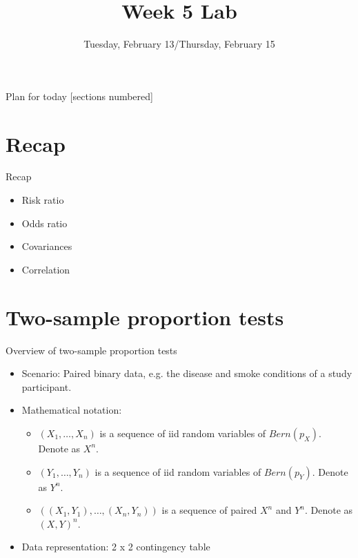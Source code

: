 \documentclass[12pt, t, xcolor=dvipsnames]{beamer}
\title{Week 5 Lab}
\date{Tuesday, February 13/Thursday, February 15}
\begin{document}
\maketitle

\begin{frame}{Plan for today}
[sections numbered]
\begin{minipage}[t][3cm][t]{\textwidth}
  \tableofcontents
\end{minipage}

\end{frame}

\section*{Recap}

\begin{frame}{Recap}
  \begin{itemize}
    \item Risk ratio
    \item Odds ratio
    \item Covariances
    \item Correlation
  \end{itemize}
\end{frame}

\section{Two-sample proportion tests} %
\label{sec:two_sample_proportion_tests}

\begin{frame}{Overview of two-sample proportion tests}

\begin{itemize}
  \item Scenario: Paired binary data, e.g. the disease and smoke conditions of a study participant. 
  \item Mathematical notation:
  \begin{itemize}
    \item  $(X_1, \ldots, X_n)$ is a sequence of iid random variables of $Bern(p_X)$. Denote as $X^n$.
    \item  $(Y_1, \ldots, Y_n)$ is a sequence of iid random variables of $Bern(p_Y)$. Denote as $Y^n$.
    \item  $((X_1, Y_1), \ldots, (X_n, Y_n))$ is a sequence of paired $X^n$ and $Y^n$. Denote as $(X, Y)^n$.
  \end{itemize}
  \item Data representation: 2 x 2 contingency table
\end{itemize}
\end{frame}
\end{document}

